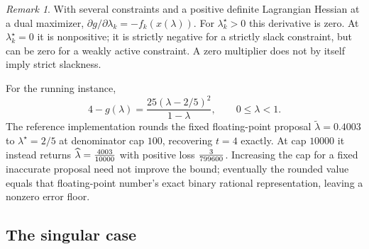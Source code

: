 \documentclass[11pt]{article}
\theoremstyle{plain}
\theoremstyle{remark}
\newtheorem*{remark}{Remark}
\begin{document}
\begin{remark}
With several constraints and a positive definite Lagrangian Hessian at a dual
maximizer, $\partial g/\partial\lambda_k=-f_k(x(\lambda))$.
For $\lambda_k^\star>0$ this derivative is zero. At $\lambda_k^\star=0$ it is
nonpositive; it is strictly negative for a strictly slack constraint, but can
be zero for a weakly active constraint. A zero multiplier does not by itself
imply strict slackness.
\end{remark}

For the running instance,
\[
4-g(\lambda)=\frac{25(\lambda-2/5)^2}{1-\lambda},\qquad 0\le\lambda<1.
\]
The reference implementation rounds the fixed floating-point proposal
$\widetilde\lambda=0.4003$ to $\lambda^\star=2/5$ at denominator cap $100$,
recovering $t=4$ exactly. At cap $10000$ it instead returns
$\widehat\lambda=\frac{4003}{10000}$ with positive loss $\frac{3}{799600}$.
Increasing the cap for a fixed inaccurate proposal need not improve the bound;
eventually the rounded value equals that floating-point number's exact binary
rational representation, leaving a nonzero error floor.

\subsection{The singular case}
\end{document}
